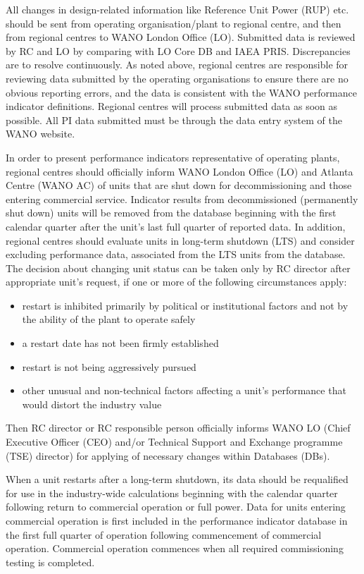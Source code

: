 All changes in design-related information like Reference Unit Power (RUP) etc. should be sent from operating organisation/plant to regional centre, and then from regional centres to WANO London Office (LO). Submitted data is reviewed by RC and LO by comparing with LO Core DB and IAEA PRIS. Discrepancies are to resolve continuously.
As noted above, regional centres are responsible for reviewing data
submitted by the operating organisations to ensure there are no
obvious reporting errors, and the data is consistent with the WANO
performance indicator definitions. Regional centres will process
submitted data as soon as possible. All PI data submitted must be
through the data entry system of the WANO website.

In order to present performance indicators representative of operating plants, regional centres should officially inform WANO London Office (LO) and Atlanta Centre (WANO AC) of units that are shut down for decommissioning and those entering commercial service. Indicator results from decommissioned (permanently shut down) units will be removed from the database beginning with the first calendar quarter after the unit’s last full quarter of reported data.
In addition, regional centres should evaluate units in long-term
shutdown (LTS) and consider excluding performance data, associated
from the LTS units from the database. The decision about changing unit
status can be taken only by RC director after appropriate unit’s
request, if one or more of the following circumstances apply:
\begin{itemize}
\item restart is inhibited primarily by political or institutional factors and not by the ability of the plant to operate safely
\item a restart date has not been firmly established
\item restart is not being aggressively pursued
\item other unusual and non-technical factors affecting a unit's
  performance that would distort the industry value
\end{itemize}
Then RC director or RC responsible person officially informs WANO LO
(Chief Executive Officer (CEO) and/or Technical Support and Exchange
programme (TSE) director) for applying of necessary changes within
Databases (DBs).

When a unit restarts after a long-term shutdown, its data should be
requalified for use in the industry-wide calculations beginning with
the calendar quarter following return to commercial operation or full
power. Data for units entering commercial operation is first included
in the performance indicator database in the first full quarter of
operation following commencement of commercial operation. Commercial
operation commences when all required commissioning testing is
completed.

